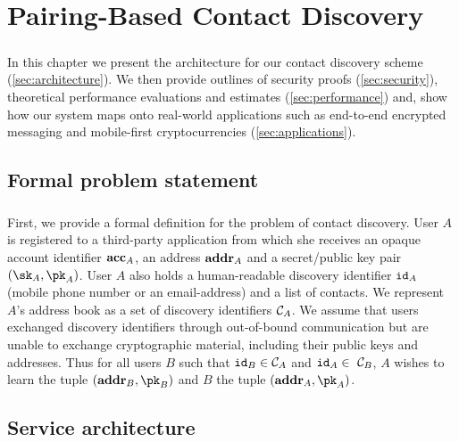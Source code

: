 \chapter{Pairing-Based Contact Discovery}
\label{chap:system}

\paragraph{} In this chapter we present the architecture for our contact discovery scheme (\autoref{sec:architecture}). We then provide outlines of security proofs (\autoref{sec:security}), theoretical performance evaluations and estimates (\autoref{sec:performance}) and, show how our system maps onto real-world applications such as end-to-end encrypted messaging and mobile-first cryptocurrencies (\autoref{sec:applications}).


\section{Formal problem statement}
\label{sec:probstatement}

\paragraph{} First, we provide a formal definition for the problem of contact discovery. User $A$ is registered to a third-party application from which she receives an opaque account identifier $\mathbf{acc}_A$, an address $\mathbf{addr}_A$ and a secret/public key pair $(\sk_A,\pk_A)$. User $A$ also holds a human-readable discovery identifier $\mathtt{id}_A$ (mobile phone number or an email-address) and a list of contacts. We represent $A$'s address book as a set of discovery identifiers $\mathcal{C}_{A}$. We assume that users exchanged discovery identifiers through out-of-bound communication but are unable to exchange cryptographic material, including their public keys and addresses. Thus for all users $B$ such that $\mathtt{id}_B \in \mathcal{C}_{A}$ and $\mathtt{id}_A \in\ \mathcal{C}_{B}$, $A$ wishes to learn the tuple $(\addr_B, \pk_B)$ and $B$ the tuple $(\addr_A, \pk_A)$.

\section{Service architecture}
\label{sec:architecture}

